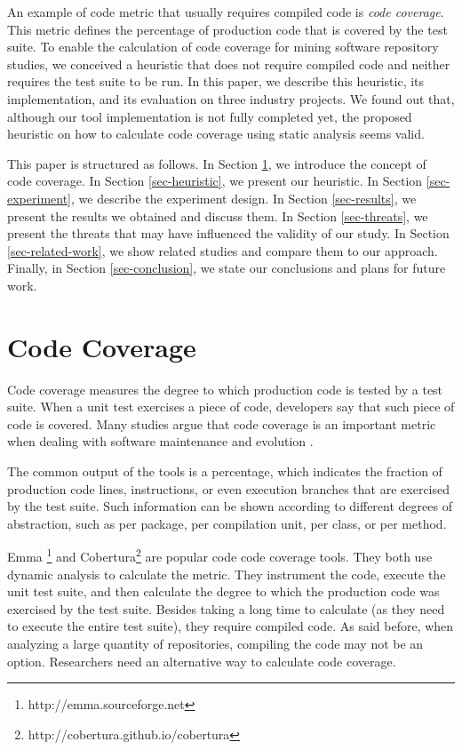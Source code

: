 \documentclass{sig-alternate}
\begin{document}
An example of code metric that usually requires compiled code is \textit{code coverage}. 
This metric defines the percentage of production code that is covered 
by the test suite. To enable the calculation of code coverage for mining software
repository studies, we conceived a heuristic that does not require compiled code
and neither requires the test suite to be run. In this paper, we describe this heuristic,
its implementation, and its evaluation on three industry projects. 
We found out that, although our tool implementation is not fully completed yet, the 
proposed heuristic on how to calculate code coverage using static analysis seems valid. 

This paper is structured as follows. In Section \ref{sec-code-coverage}, 
we introduce the concept of code coverage. In Section \ref{sec-heuristic}, 
we present our heuristic. In Section \ref{sec-experiment}, we describe the 
experiment design. In Section \ref{sec-results}, we present the results we 
obtained and discuss them. In Section \ref{sec-threats}, 
we present the threats that may have influenced the validity of our study. 
In Section \ref{sec-related-work}, we show related studies and compare them 
to our approach. Finally, in Section \ref{sec-conclusion}, we state our 
conclusions and plans for future work.


\section{Code Coverage}
\label{sec-code-coverage}

Code coverage measures the degree to which production code is tested by a test suite. 
When a unit test exercises a piece of code, developers say that such piece
of code is covered. Many studies argue that code coverage is an important
metric when dealing with software maintenance and evolution \cite{sebastian} \cite{del-frate} \cite{mei-hwa}.

The common output of the tools is a percentage, which indicates the fraction of production code lines, instructions, 
or even execution branches that are exercised by the test suite. Such information can be shown according to different
degrees of abstraction, such as per package, per compilation unit, per class, or per method. 

Emma \footnote{http://emma.sourceforge.net} and Cobertura\footnote{http://cobertura.github.io/cobertura} are popular 
code code coverage tools. They both use dynamic analysis to calculate the metric. They instrument the code, execute 
the unit test suite, and then calculate the degree to which the production code was exercised by the test suite. Besides 
taking a long time to calculate (as they need to execute the entire test suite),
they require compiled code. As said before, when analyzing a large quantity of repositories,
compiling the code may not be an option. Researchers need an alternative way to calculate code coverage.
\end{document}
